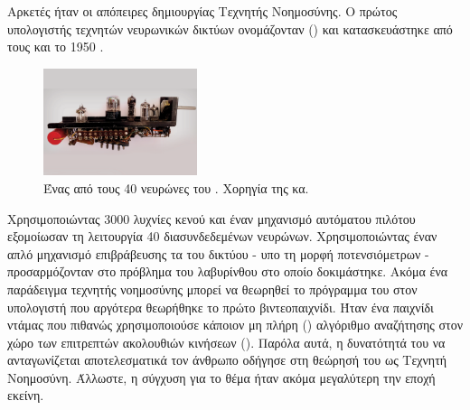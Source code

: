 Αρκετές ήταν οι απόπειρες δημιουργίας Τεχνητής Νοημοσύνης. Ο πρώτος υπολογιστής τεχνητών νευρωνικών δικτύων ονομάζονταν  () και κατασκευάστηκε από τους  και  το 1950 \cite{akst_2019}. 
\begin{figure}
    \begin{center}
      \includegraphics[width=0.40\textwidth]{images/introduction/neuron of Stochastic Neural Analog Reinforcement Calculator.png}
    \end{center}
    \caption{Ένας από τους 40 νευρώνες του . Χορηγία της κα.  \cite{akst_2019}}
  \end{figure}
Χρησιμοποιώντας 3000 λυχνίες κενού και έναν μηχανισμό αυτόματου πιλότου εξομοίωσαν τη λειτουργία 40 διασυνδεδεμένων νευρώνων. Χρησιμοποιώντας έναν απλό μηχανισμό επιβράβευσης τα  του δικτύου - υπο τη μορφή ποτενσιόμετρων - προσαρμόζονταν  στο πρόβλημα του λαβυρίνθου στο οποίο δοκιμάστηκε. Ακόμα ένα παράδειγμα τεχνητής νοημοσύνης μπορεί να θεωρηθεί το πρόγραμμα του  στον υπολογιστή  \cite{lee1995computer} που αργότερα θεωρήθηκε το πρώτο βιντεοπαιχνίδι. Ήταν ένα παιχνίδι ντάμας που πιθανώς χρησιμοποιούσε κάποιον μη πλήρη () αλγόριθμο αναζήτησης στον χώρο των επιτρεπτών ακολουθιών κινήσεων (). Παρόλα αυτά, η δυνατότητά του να ανταγωνίζεται αποτελεσματικά τον άνθρωπο οδήγησε στη θεώρησή του ως Τεχνητή Νοημοσύνη. Άλλωστε, η σύγχυση για το θέμα ήταν ακόμα μεγαλύτερη την εποχή εκείνη. 
\par

